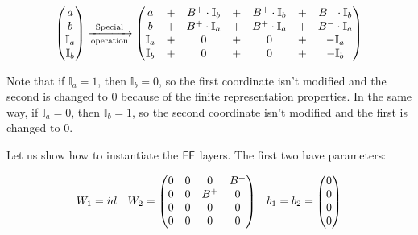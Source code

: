 \begin{equation*}
    \left(\begin{matrix}
        a \\ b \\ \mathbb{I}_a \\ \mathbb{I}_b 
    \end{matrix}\right)
    \xrightarrow[\text{operation}]{\text{Special}}
    \left(\begin{matrix}
        a            &+& B^{+} \cdot \mathbb{I}_b &+& B^{+} \cdot \mathbb{I}_b &+& B^{-} \cdot \mathbb{I}_b \\
        b            &+& B^{+} \cdot \mathbb{I}_a &+& B^{+} \cdot \mathbb{I}_a &+& B^{-} \cdot \mathbb{I}_a \\ 
        \mathbb{I}_a &+& 0                          &+& 0                          &+& -\mathbb{I}_a\\
        \mathbb{I}_b &+& 0                          &+& 0                          &+& -\mathbb{I}_b\\
    \end{matrix}\right)    
\end{equation*}


Note that if $\mathbb{I}_a = 1$, then $\mathbb{I}_b = 0$, so the first coordinate isn't modified and the second is changed to $0$ because of the finite representation properties.
In the same way, if $\mathbb{I}_a = 0$, then $\mathbb{I}_b = 1$, so the second coordinate isn't modified and the first is changed to $0$.

\medskip

Let us show how to instantiate the $\mathsf{FF}$ layers.
The first two have parameters:

\begin{align*}
    & W_1 = id
    & W_2  = \left(\begin{matrix}
        0  & 0  & 0        & B^{+}   \\
        0  & 0  & B^{+}  & 0         \\
        0  & 0  & 0        & 0         \\
        0  & 0  & 0        & 0         \\
    \end{matrix}\right) &
    & b_1 = b_2 = \left(\begin{matrix}
        0 \\
        0 \\
        0 \\
        0
    \end{matrix}\right) 
\end{align*}


